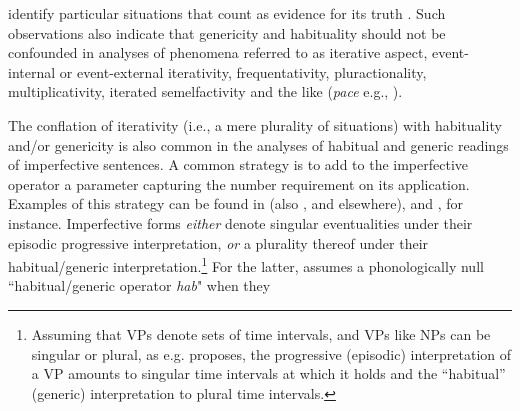 \documentclass[output=paper,colorlinks,citecolor=brown]{langscibook}
\begin{document}
identify particular situations that count as evidence for its truth
\citep{carlson1995truth}.  Such observations also indicate
that genericity and habituality should not be confounded in analyses of phenomena referred to as iterative aspect, event-internal or event-external iterativity, frequentativity, pluractionality, multiplicativity, iterated semelfactivity and the like (\textit{pace} e.g., \citealt{nef1986semantique, geenhoven2001noun,geenhoven2004adverbials, scheiner2003temporal}).

\largerpage
The conflation of iterativity (i.e., a mere plurality of situations) with habituality and/or genericity
is also common in the analyses of habitual and generic readings of imperfective sentences.
A common strategy is to add to the imperfective operator a parameter capturing the number requirement on its application.
Examples of this strategy can be found
in \citet{ferreira2016} (also \citealt{ferreira2004,ferreira2005}, and elsewhere), and \citet{hacquardDISS}, for instance.
Imperfective forms  \textit{either} denote singular eventualities under their episodic progressive interpretation, \textit{or} a plurality thereof
under their habitual/generic interpretation.\footnote{Assuming that VPs denote
sets of time intervals, and VPs like NPs can be singular or plural, as e.g. \citet[358]{ferreira2016} proposes,
the progressive (episodic) interpretation of a VP amounts to
singular time intervals at which it holds and the ``habitual'' (generic) interpretation to plural time intervals.}
For the latter, \citet[29]{ferreira2005} assumes a phonologically null ``habitual/generic operator \textit{hab}" when they
\end{document}
